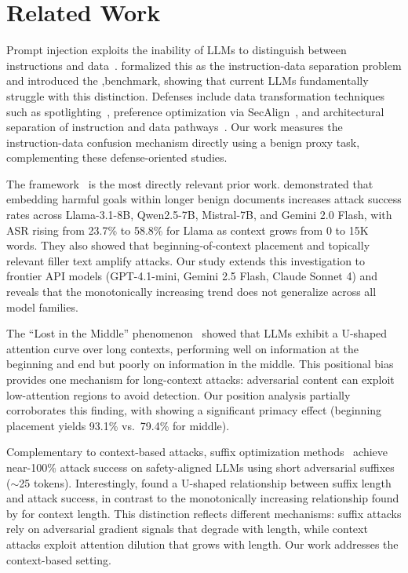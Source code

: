 \section{Related Work}
\label{sec:related}

 Prompt injection exploits the inability of LLMs to distinguish between instructions and data~\citep{greshake2023not}. \citet{gozverev2025can} formalized this as the instruction-data separation problem and introduced the \sep benchmark, showing that current LLMs fundamentally struggle with this distinction. Defenses include data transformation techniques such as spotlighting~\citep{hines2024spotlighting}, preference optimization via SecAlign~\citep{chen2024secalign}, and architectural separation of instruction and data pathways~\citep{wallace2025aside}. Our work measures the instruction-data confusion mechanism directly using a benign proxy task, complementing these defense-oriented studies.

 The \ninja framework~\citep{shah2025ninja} is the most directly relevant prior work. \citet{shah2025ninja} demonstrated that embedding harmful goals within longer benign documents increases attack success rates across Llama-3.1-8B, Qwen2.5-7B, Mistral-7B, and Gemini 2.0 Flash, with ASR rising from 23.7\% to 58.8\% for Llama as context grows from 0 to 15K words. They also showed that beginning-of-context placement and topically relevant filler text amplify attacks. Our study extends this investigation to frontier API models (GPT-4.1-mini, Gemini 2.5 Flash, Claude Sonnet 4) and reveals that the monotonically increasing trend does not generalize across all model families.

 The ``Lost in the Middle'' phenomenon~\citep{liu2024lost} showed that LLMs exhibit a U-shaped attention curve over long contexts, performing well on information at the beginning and end but poorly on information in the middle. This positional bias provides one mechanism for long-context attacks: adversarial content can exploit low-attention regions to avoid detection. Our position analysis partially corroborates this finding, with \gptmini showing a significant primacy effect (beginning placement yields 93.1\% \isr vs.\ 79.4\% for middle).

 Complementary to context-based attacks, suffix optimization methods~\citep{andriushchenko2024jailbreaking} achieve near-100\% attack success on safety-aligned LLMs using short adversarial suffixes (${\sim}$25 tokens). Interestingly, \citet{andriushchenko2024jailbreaking} found a U-shaped relationship between suffix length and attack success, in contrast to the monotonically increasing relationship found by \citet{shah2025ninja} for context length. This distinction reflects different mechanisms: suffix attacks rely on adversarial gradient signals that degrade with length, while context attacks exploit attention dilution that grows with length. Our work addresses the context-based setting.

